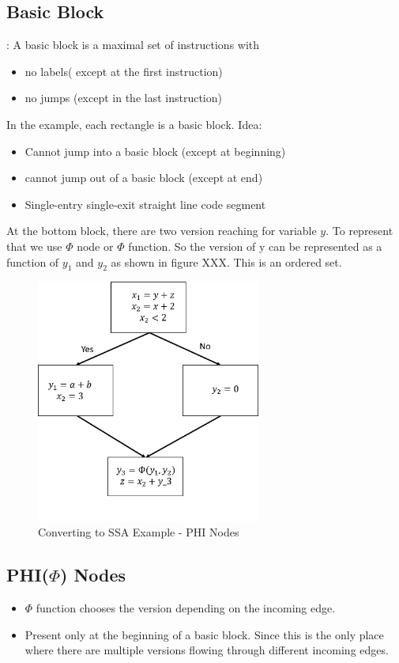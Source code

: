 \subsection{Basic Block}: 
A basic block is a maximal set of instructions with 
\begin{itemize}
    \item no labels( except at the first instruction)
    \item no jumps (except in the last instruction)
\end{itemize}

In the example, each rectangle is a basic block. 
Idea:
\begin{itemize}
    \item Cannot jump into a basic block (except at beginning)
    \item cannot jump out of a basic block (except at end)
    \item Single-entry single-exit straight line code segment
\end{itemize}

At the bottom block, there are two version reaching for variable $y$. To represent that we use $\Phi$ node or $\Phi$ function. So the version of y can be represented as a function of $y_1$ and $y_2$ as shown in figure XXX. This is an ordered set.


\begin{figure}
\centering
\includegraphics[height=8cm]{images/Example3.png}
\caption{Converting to SSA Example - PHI Nodes}
\end{figure} 

\subsection{PHI($\Phi$) Nodes}
\begin{itemize}
    \item $\Phi$ function chooses the version depending on the incoming edge.
    \item Present only at the beginning of a basic block. Since this is the only place where there are multiple versions flowing through different incoming edges.
\end{itemize}


